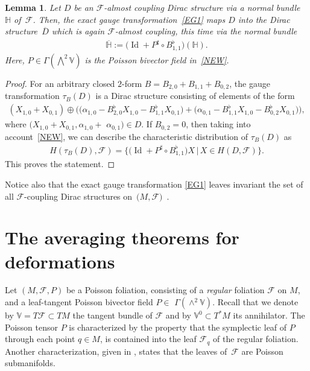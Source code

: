 \documentclass[pdftex]{sigma}
\numberwithin{equation}{section}
\newtheorem{Lemma}[Theorem]{Lemma}
\begin{document}
\begin{Lemma}\label{lema31}
Let $D$ be an $\mathcal{F}$-almost coupling Dirac structure via a normal bundle~$\mathbb{H}$ of~$\mathcal{F}$. Then, the exact gauge transformation~\eqref{EG1} maps $D$ into the Dirac structure~$\overline{D}$ which is again $\mathcal{F}$-almost coupling, this time via the normal bundle
\begin{gather*}
\mathbb{\overline{H}}:=\big(\operatorname{Id}+P^{\sharp}\circ B_{1,1}^{\flat}\big)(\mathbb{H}).
\end{gather*}
Here, $P\in\Gamma(\bigwedge^{2}\mathbb{V})$ is the Poisson bivector field in~\eqref{NEW}.
\end{Lemma}

\begin{proof}
For an arbitrary closed $2$-form $B=B_{2,0}+B_{1,1}+B_{0,2}$, the gauge transformation $\tau_{B}(D)$ is a Dirac structure consisting of elements
of the form
\begin{gather*}
(X_{1,0}+X_{0,1})\oplus\big( \big(\alpha_{1,0}-B_{2,0}^{\flat}X_{1,0} -B_{1,1}^{\flat}X_{0,1}\big) +\big(\alpha_{0,1}-B_{1,1}^{\flat}X_{1,0}-B_{0,2}^{\flat}X_{0,1}\big)\big) ,
\end{gather*}
where $(X_{1,0}+X_{0,1},\alpha_{1,0}+$ $\alpha_{0,1})\in D$. If $B_{0,2}=0$, then taking into account~\eqref{NEW}, we can describe the characteristic distribution of $\tau_{B}(D)$ as
\begin{gather*}
H(\tau_{B}(D),\mathcal{F})=\big\{\big(\operatorname{Id}+P^{\sharp}\circ B_{1,1}^{\flat}\big)X\,|\, X\in H(D,\mathcal{F})\big\}.
\end{gather*}
This proves the statement.
\end{proof}

Notice also that the exact gauge transformation \eqref{EG1} leaves invariant the set of all $\mathcal{F}$-coupling Dirac structures on~$(M,\mathcal{F)}$~\cite{JVYV-14}.

\section{The averaging theorems for deformations}

Let $(M,\mathcal{F},P)$ be a Poisson foliation, consisting of a \emph{regular} foliation $\mathcal{F}$ on $M$, and a leaf-tangent Poisson bivector f\/ield $P\in$ $\Gamma(\wedge^{2}\mathbb{V})$. Recall that we denote by $\mathbb{V}=T\mathcal{F}\subset TM$ the tangent bundle of $\mathcal{F}$ and by $\mathbb{V}^{0}\subset T^{\ast}M$ its annihilator. The Poisson tensor $P$ is characterized by the property that the symplectic leaf of $P$ through each point $q\in M$, is contained into the leaf $\mathcal{F}_{q}$ of the regular foliation. Another characterization, given in \cite{Va-06}, states that the leaves of~$\mathcal{F}$ are Poisson submanifolds.
\end{document}
